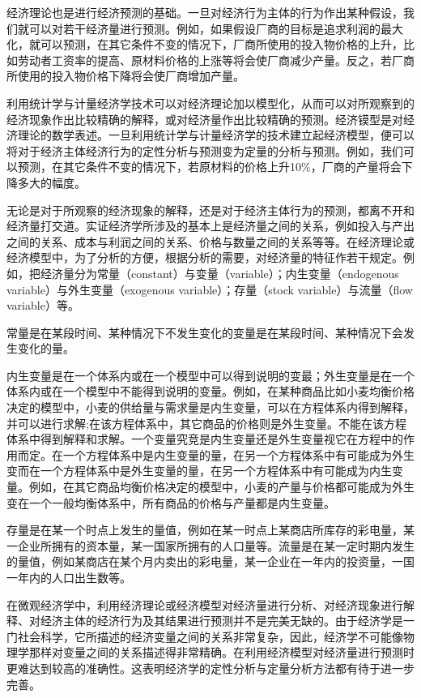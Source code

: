 经济理论也是进行经济预测的基础。一旦对经济行为主体的行为作出某种假设，我们就可以对若干经济量进行预测。例如，如果假设厂商的目标是追求利润的最大化，就可以预测，在其它条件不变的情况下，厂商所使用的投入物价格的上升，比如劳动者工资率的提高、原材料价格的上涨等将会使厂商减少产量。反之，若厂商所使用的投入物价格下降将会使厂商增加产量。

利用统计学与计量经济学技术可以对经济理论加以模型化，从而可以对所观察到的经济现象作出比较精确的解释，或对经济量作出比较精确的预测。经济镆型是对经济理论的数学表述。一旦利用统计学与计量经济学的技术建立起经济模型，便可以将对于经济主体经济行为的定性分析与预测变为定量的分析与预测。例如，我们可以预测，在其它条件不变的情况下，若原材料的价格上升10\%，厂商的产量将会下降多大的幅度。

无论是对于所观察的经济现象的解释，还是对于经济主体行为的预测，都离不开和经济量打交道。实证经济学所涉及的基本上是经济量之间的关系，例如投入与产出之间的关系、成本与利润之间的关系、价格与数量之间的关系等等。在经济理论或经济模型中，为了分析的方便，根据分析的需要，对经济量的特征作若干规定。例如，把经济量分为常量（constant）与变量（variable）；内生变量（endogenous variable）与外生变量（exogenous variable）；存量（stock variable）与流量（flow variable）等。

{\hei 常量}是在某段时间、某种情况下不发生变化的变量是在某段时间、某种情况下会发生变化的量。

{\hei 内生变量}是在一个体系内或在一个模型中可以得到说明的变最；外生变量是在一个体系内或在一个模型中不能得到说明的变量。例如，在某种商品比如小麦均衡价格决定的模型中，小麦的供给量与需求量是内生变量，可以在方程体系内得到解释，并可以进行求解;在该方程体系中，其它商品的价格则是外生变量。不能在该方程体系中得到解释和求解。一个变量究竞是内生变量还是外生变量视它在方程中的作用而定。在一个方程体系中是内生变量的量，在另一个方程体系中有可能成为外生变而在一个方程体系中是外生变量的量，在另一个方程体系中有可能成为内生变量。例如，在其它商品均衡价格决定的模型中，小麦的产量与价格都可能成为外生变在一个一般均衡体系中，所有商品的价格与产量都是内生变量。

{\hei 存量}是在某一个时点上发生的量值，例如在某一时点上某商店所库存的彩电量，某一企业所拥有的资本量，某一国家所拥有的人口量等。{\hei 流量}是在某一定时期内发生的量值，例如某商店在某个月内卖出的彩电量，某一企业在一年内的投资量，一国一年内的人口出生数等。

在微观经济学中，利用经济理论或经济模型对经济量进行分析、对经济现象进行解释、对经济主体的经济行为及其结果进行预测并不是完美无缺的。由于经济学是一门社会科学，它所描述的经济变量之间的关系非常复杂，因此，经济学不可能像物理学那样对变量之间的关系描述得非常精确。在利用经济模型对经济量进行预测时更难达到较高的准确性。这表明经济学的定性分析与定量分析方法都有待于进一步完善。

